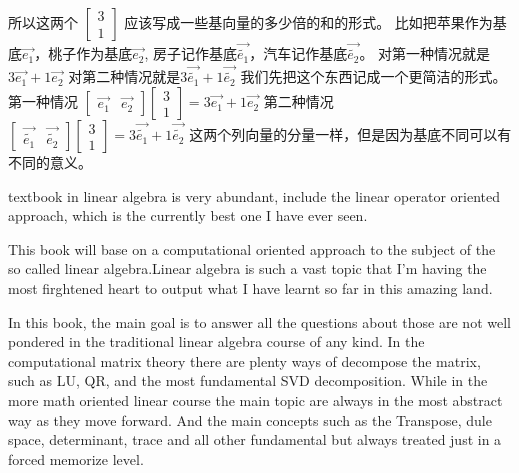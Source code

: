 \documentclass{book}
\begin{document}
\begin{CJK}{UTF8}{gbsn}
    所以这两个
    $\left[\begin{matrix}
                3 \\
                1
            \end{matrix}\right]$
    应该写成一些基向量的多少倍的和的形式。
    比如把苹果作为基底$\vec{e_1}$，桃子作为基底$\vec{e_2}$,
    房子记作基底$\vec{\tilde{e_1}}$，汽车记作基底$\vec{\tilde{e_2}}$。
    对第一种情况就是$3\vec{e_1}+1\vec{e_2}$
    对第二种情况就是$3\vec{\tilde{e_1}}+1\vec{\tilde{e_2}}$
    我们先把这个东西记成一个更简洁的形式。
    第一种情况
    $\left[\begin{matrix}
                \vec{e_1} & \vec{e_2}
            \end{matrix}\right]
        \left[\begin{matrix}
                3 \\
                1
            \end{matrix}\right]=3\vec{e_1}+1\vec{e_2}$
    第二种情况
    $\left[\begin{matrix}
                \vec{\tilde{e_1}} & \vec{\tilde{e_2}}
            \end{matrix}\right]
        \left[\begin{matrix}
                3 \\
                1
            \end{matrix}\right]=3\vec{\tilde{e_1}}+1\vec{\tilde{e_2}}$
    这两个列向量的分量一样，但是因为基底不同可以有
    不同的意义。


    textbook in linear algebra is very abundant,
    include the linear operator oriented approach,
    which is the currently best one I have ever seen.

    This book will base on a computational oriented
    approach to the subject of the so called linear
    algebra.Linear algebra is such a vast topic that
    I'm having the most firghtened heart to output
    what I have learnt so far in this amazing land.

    In this book, the main goal is to answer all the
    questions about those are not well pondered in the
    traditional linear algebra course of any kind.
    In the computational matrix theory there are plenty
    ways of decompose the matrix, such as LU, QR, and the
    most fundamental SVD decomposition.
    While in the more math oriented linear course
    the main topic are always in the most abstract way
    as they move forward.
    And the main concepts such as the Transpose, dule
    space, determinant, trace and all other fundamental
    but always treated just in a forced memorize level.


\end{CJK}
\end{document}
